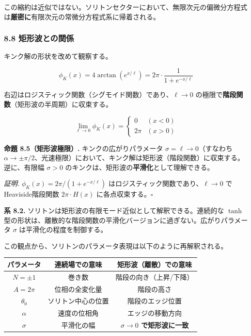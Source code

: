 \documentclass[a4paper,11pt]{ltjsarticle}
\newcounter{none}
\begin{document}
この縮約は近似ではない。ソリトンセクターにおいて、無限次元の偏微分方程式は\textbf{厳密に}有限次元の常微分方程式系に帰着される。

\subsubsection{8.8
矩形波との関係}\label{ux77e9ux5f62ux6ce2ux3068ux306eux95a2ux4fc2}

キンク解の形状を改めて観察する。

\[\phi_K(x) = 4\arctan(e^{x/\ell}) = 2\pi \cdot \frac{1}{1 + e^{-x/\ell}}\]

右辺はロジスティック関数（シグモイド関数）であり、\(\ell \to 0\)
の極限で\textbf{階段関数}（矩形波の半周期）に収束する。

\[\lim_{\ell \to 0} \phi_K(x) = \begin{cases} 0 & (x < 0) \\ 2\pi & (x > 0) \end{cases}\]

\textbf{命題 8.5（矩形波極限）.} キンクの広がりパラメータ
\(\sigma = \ell \to 0\)（すなわち
\(\alpha \to \pm\pi/2\)、光速極限）において、キンク解は矩形波（階段関数）に収束する。逆に、有限幅
\(\sigma > 0\) のキンクは、矩形波の\textbf{平滑化}として理解できる。

\emph{証明.} \(\phi_K(x) = 2\pi/(1 + e^{-x/\ell})\)
はロジスティック関数であり、\(\ell \to 0\) で Heaviside階段関数
\(2\pi \cdot H(x)\) に各点収束する。\(\square\)

\textbf{系 8.2.}
ソリトンは矩形波の有限モード近似として解釈できる。連続的な \(\tanh\)
型の形状は、離散的な階段関数の平滑化バージョンに過ぎない。広がりパラメータ
\(\sigma\) は平滑化の程度を制御する。

この観点から、ソリトンのパラメータ表現は以下のように再解釈される。

{\def\LTcaptype{none} %
\begin{longtable}[]{@{}ccc@{}}
\toprule\noalign{}
パラメータ & 連続場での意味 & 矩形波（離散）での意味 \\
\midrule\noalign{}
\endhead
\bottomrule\noalign{}
\endlastfoot
\(N = \pm 1\) & 巻き数 & 階段の向き（上昇/下降） \\
\(A = 2\pi\) & 位相の全変化量 & 階段の高さ \\
\(\theta_0\) & ソリトン中心の位置 & 階段のエッジ位置 \\
\(\alpha\) & 速度の位相角 & エッジの移動方向 \\
\(\sigma\) & 平滑化の幅 & \textbf{\(\sigma \to 0\) で矩形波に一致} \\
\end{longtable}
}
\end{document}
